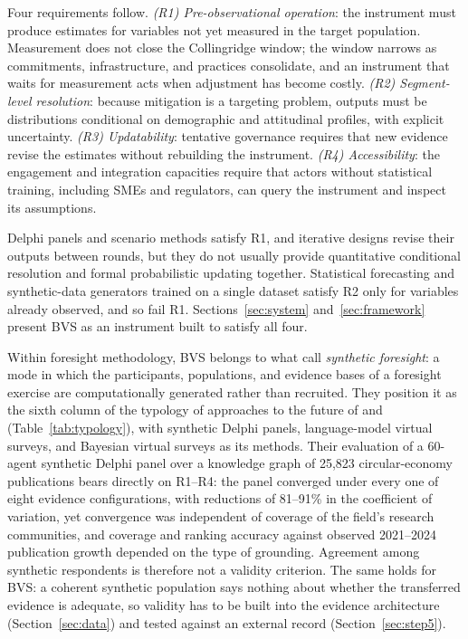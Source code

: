 Four requirements follow. \emph{(R1) Pre-observational operation}: the
instrument must produce estimates for variables not yet measured in the target
population. Measurement does not close the Collingridge window; the window
narrows as commitments, infrastructure, and practices consolidate, and an
instrument that waits for measurement acts when adjustment has become costly.
\emph{(R2) Segment-level resolution}: because mitigation is a targeting
problem, outputs must be distributions conditional on demographic and
attitudinal profiles, with explicit uncertainty. \emph{(R3) Updatability}:
tentative governance requires that new evidence revise the estimates without
rebuilding the instrument. \emph{(R4) Accessibility}: the engagement and
integration capacities require that actors without statistical training,
including SMEs and regulators, can query the instrument and inspect its
assumptions.

Delphi panels and scenario methods satisfy R1, and iterative designs revise
their outputs between rounds, but they do not usually provide quantitative
conditional resolution and formal probabilistic updating together. Statistical
forecasting and synthetic-data generators trained on a single dataset satisfy
R2 only for variables already observed, and so fail R1.
Sections~\ref{sec:system} and~\ref{sec:framework} present BVS as an instrument
built to satisfy all four.

Within foresight methodology, BVS belongs to what \citet{bossler2026} call
\emph{synthetic foresight}: a mode in which the participants, populations, and
evidence bases of a foresight exercise are computationally generated rather
than recruited. They position it as the sixth column of the typology of
approaches to the future of \citet{bas2004} and \citet{bas2015}
(Table~\ref{tab:typology}), with synthetic Delphi panels, language-model
virtual surveys, and Bayesian virtual surveys as its methods. Their evaluation
of a 60-agent synthetic Delphi panel over a knowledge graph of 25{,}823
circular-economy publications bears directly on R1--R4: the panel converged
under every one of eight evidence configurations, with reductions of 81--91\%
in the coefficient of variation, yet convergence was independent of coverage of
the field's research communities, and coverage and ranking accuracy against
observed 2021--2024 publication growth depended on the type of grounding.
Agreement among synthetic respondents is therefore not a validity criterion.
The same holds for BVS: a coherent synthetic population says nothing about
whether the transferred evidence is adequate, so validity has to be built into
the evidence architecture (Section~\ref{sec:data}) and tested against an
external record (Section~\ref{sec:step5}).

